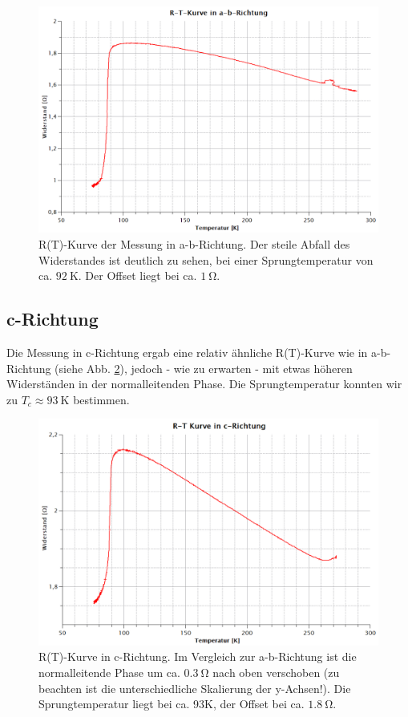 \begin{figure}[H]
	\begin{center}
		\includegraphics[width=15cm]{a-b.png}
		\caption{R(T)-Kurve der Messung in a-b-Richtung. Der steile Abfall des Widerstandes ist deutlich zu sehen, bei einer Sprungtemperatur von ca. $\SI{92}{\kelvin}$. Der Offset liegt bei ca. $\SI{1}{\ohm}$.}
		\label{ab}
	\end{center}
\end{figure}

\subsection{c-Richtung}
Die Messung in c-Richtung ergab eine relativ ähnliche R(T)-Kurve wie in a-b-Richtung (siehe Abb. \ref{c}), jedoch - wie zu erwarten - mit etwas höheren Widerständen in der normalleitenden Phase. Die Sprungtemperatur konnten wir zu $T_{c}\approx\SI{93}{\kelvin}$ bestimmen.

\begin{figure}[H]
	\begin{center}
		\includegraphics[width=15cm]{c.png}
		\caption{R(T)-Kurve in c-Richtung. Im Vergleich zur a-b-Richtung ist die normalleitende Phase um ca. $\SI{0,3}{\ohm}$ nach oben verschoben (zu beachten ist die unterschiedliche Skalierung der y-Achsen!). Die Sprungtemperatur liegt bei ca. 93K, der Offset bei ca. $\SI{1,8}{\ohm}$. }
		\label{c}
	\end{center}
\end{figure} 
 
